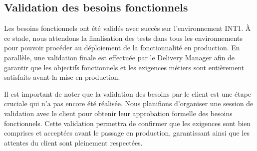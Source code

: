 \subsection{Validation des besoins fonctionnels}
Les besoins fonctionnels ont été validés avec succès sur l'environnement INT1. À ce stade, nous attendons la finalisation des tests dans tous les environnements pour pouvoir procéder au déploiement de la fonctionnalité en production. En parallèle, une validation finale est effectuée par le Delivery Manager afin de garantir que les objectifs fonctionnels et les exigences métiers sont entièrement satisfaits avant la mise en production.

Il est important de noter que la validation des besoins par le client est une étape cruciale qui n'a pas encore été réalisée. Nous planifions d'organiser une session de validation avec le client pour obtenir leur approbation formelle des besoins fonctionnels. Cette validation permettra de confirmer que les exigences sont bien comprises et acceptées avant le passage en production, garantissant ainsi que les attentes du client sont pleinement respectées.

